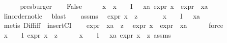 \begin{isabellebody}
\ \ \ \ \isamarkupfalse%
\ presburger\isanewline
{}\isamarkupfalse%
\isanewline
\ \ \isamarkupfalse%
\ False\isanewline
\ \ \isamarkupfalse%
\ \isamarkupfalse%
\ x\ \ {\isachardoublequoteopen}x\ {\isasymin}\ {\isasymPhi}\ {\isacharbackquote}{\kern0pt}\ I\ {\isacharminus}{\kern0pt}\ {\isacharbraceleft}{\kern0pt}{\isasymPhi}\ xa{\isacharbraceright}{\kern0pt}{\isachardoublequoteclose}\ {\isachardoublequoteopen}expr{\isacharunderscore}{\kern0pt}{}\ x\ {\isasymge}\ expr{\isacharunderscore}{\kern0pt}{}\ {\isacharparenleft}{\kern0pt}{\isasymPhi}\ xa{\isacharparenright}{\kern0pt}{\isachardoublequoteclose}\isanewline
\ \ \ \ \isamarkupfalse%
\ linorder{\isacharunderscore}{\kern0pt}not{\isacharunderscore}{\kern0pt}le\ \isamarkupfalse%
\ blast\isanewline
\ \ \isamarkupfalse%
\ assms\ \isamarkupfalse%
\ {\isachardoublequoteopen}expr{\isacharunderscore}{\kern0pt}{}\ x\ {\isasymle}\ z{\isachardoublequoteclose}\ \isanewline
\ \ \ \ \isamarkupfalse%
\ {\isacartoucheopen}x\ {\isasymin}\ {\isasymPhi}\ {\isacharbackquote}{\kern0pt}\ I\ {\isacharminus}{\kern0pt}\ {\isacharbraceleft}{\kern0pt}{\isasymPhi}\ xa{\isacharbraceright}{\kern0pt}{\isacartoucheclose}\isanewline
\ \ \ \ \isamarkupfalse%
\ {\isacharparenleft}{\kern0pt}metis\ Diff{\isacharunderscore}{\kern0pt}iff\ \ insertCI{\isacharparenright}{\kern0pt}\isanewline
\ \ \isamarkupfalse%
\ {\isachardoublequoteopen}expr{\isacharunderscore}{\kern0pt}{}\ {\isacharparenleft}{\kern0pt}{\isasymPhi}\ xa{\isacharparenright}{\kern0pt}\ {\isasymle}\ z{\isachardoublequoteclose}\ \isamarkupfalse%
\ {\isacartoucheopen}expr{\isacharunderscore}{\kern0pt}{}\ x\ {\isasymge}\ expr{\isacharunderscore}{\kern0pt}{}\ {\isacharparenleft}{\kern0pt}{\isasymPhi}\ xa{\isacharparenright}{\kern0pt}{\isacartoucheclose}\isanewline
\ \ \ \ \isamarkupfalse%
\ force\isanewline
\ \ \isamarkupfalse%
\ {\isachardoublequoteopen}{\isasymforall}x\ {\isasymin}\ {\isacharparenleft}{\kern0pt}{\isasymPhi}\ {\isacharbackquote}{\kern0pt}\ I{\isacharparenright}{\kern0pt}{\isachardot}{\kern0pt}\ expr{\isacharunderscore}{\kern0pt}{}\ x\ {\isasymle}\ z{\isachardoublequoteclose}\isanewline
\ \ \ \ \isamarkupfalse%
\ {\isacartoucheopen}x\ {\isasymin}\ {\isasymPhi}\ {\isacharbackquote}{\kern0pt}\ I\ {\isacharminus}{\kern0pt}\ {\isacharbraceleft}{\kern0pt}{\isasymPhi}\ xa{\isacharbraceright}{\kern0pt}{\isacartoucheclose}\ {\isacartoucheopen}expr{\isacharunderscore}{\kern0pt}{}\ x\ {\isacharless}{\kern0pt}{\isacharequal}{\kern0pt}\ z{\isacartoucheclose}\ assms{\isacharparenleft}{\kern0pt}{}{\isacharparenright}{\kern0pt}\isanewline

\end{isabellebody}
